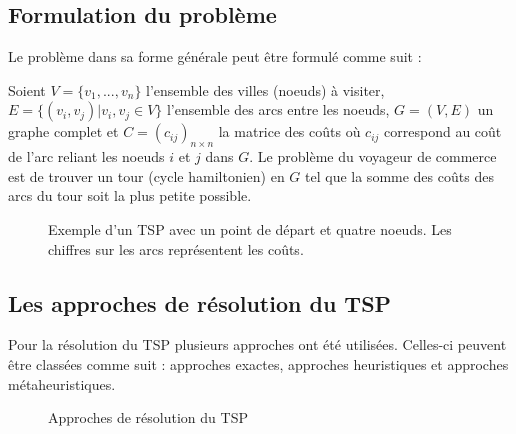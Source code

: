 \subsection{Formulation du problème}
Le problème dans sa forme générale peut être formulé comme suit :

\medskip
Soient $ V = \{v_1,...,v_n\} $ l'ensemble des villes (noeuds) à visiter, $ E = \{ (v_i,v_j) | v_i,v_j \in V \}$ l'ensemble des arcs entre les noeuds, $G = (V,E)$ un graphe complet et $C = (c_{ij})_{n × n}$ la matrice des coûts où $c_{ij}$ correspond au coût de l'arc reliant les noeuds $i$ et $j$ dans $G$. Le problème du voyageur de commerce est de trouver un tour (cycle hamiltonien) en $G$ tel que la somme des coûts des arcs du tour soit la plus petite possible.

\medskip

\begin{figure}[hbt!]
  \centering
  \caption{Exemple d'un TSP avec un point de départ et quatre noeuds. Les chiffres sur les arcs représentent les coûts.}
  \label{fig:tsp-example}
\end{figure}
\FloatBarrier

\subsection{Les approches de résolution du TSP}

Pour la résolution du TSP plusieurs approches ont été utilisées. Celles-ci peuvent être classées comme suit : approches exactes, approches heuristiques et approches métaheuristiques.

\medskip

\begin{figure}[hbt!]
  \centering
  \caption{Approches de résolution du TSP}
  \label{fig:tsp-solutions}
\end{figure}
\FloatBarrier

